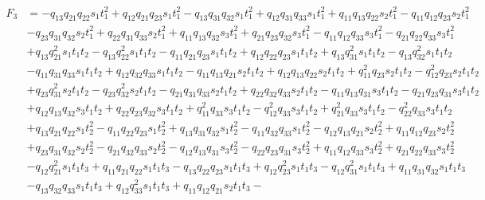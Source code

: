 \documentclass[10pt]{amsart}
\theoremstyle{definition}
\theoremstyle{corollary}
\theoremstyle{remark}
\theoremstyle{conclusion}
\begin{document}
{\small \begin{equation}
\begin{split}
F_3&=-q_{13} q_{21} q_{22} s_{1} t_{1}^2 + q_{12} q_{21} q_{23} s_{1} t_{1}^2 - q_{13} q_{31} q_{32} s_{1} t_{1}^2 + 
q_{12} q_{31} q_{33} s_{1} t_{1}^2 + q_{11} q_{13} q_{22} s_{2} t_{1}^2 - q_{11} q_{12} q_{23} s_{2} t_{1}^2\\
& - q_{23} q_{31} q_{32} s_{2} t_{1}^2 + q_{22} q_{31} q_{33} s_{2} t_{1}^2 + q_{11} q_{13} q_{32} s_{3} t_{1}^2 + 
q_{21} q_{23} q_{32} s_{3} t_{1}^2 - q_{11} q_{12} q_{33} s_{3} t_{1}^2 - q_{21} q_{22} q_{33} s_{3} t_{1}^2 \\
&+ 
q_{13} q_{21}^2 s_{1} t_{1} t_{2} - q_{13} q_{22}^2 s_{1} t_{1} t_{2} - q_{11} q_{21} q_{23} s_{1} t_{1} t_{2} + 
q_{12} q_{22} q_{23} s_{1} t_{1} t_{2} + q_{13} q_{31}^2 s_{1} t_{1} t_{2} - q_{13} q_{32}^2 s_{1} t_{1} t_{2} \\
&- 
q_{11} q_{31} q_{33} s_{1} t_{1} t_{2} + q_{12} q_{32} q_{33} s_{1} t_{1} t_{2} - q_{11} q_{13} q_{21} s_{2} t_{1} t_{2} + 
q_{12} q_{13} q_{22} s_{2} t_{1} t_{2} + q_{11}^2 q_{23} s_{2} t_{1} t_{2} - q_{12}^2 q_{23} s_{2} t_{1} t_{2} \\
&+ 
q_{23} q_{31}^2 s_{2} t_{1} t_{2} - q_{23} q_{32}^2 s_{2} t_{1} t_{2} - q_{21} q_{31} q_{33} s_{2} t_{1} t_{2} + 
q_{22} q_{32} q_{33} s_{2} t_{1} t_{2} - q_{11} q_{13} q_{31} s_{3} t_{1} t_{2} - q_{21} q_{23} q_{31} s_{3} t_{1} t_{2} \\
&+ 
q_{12} q_{13} q_{32} s_{3} t_{1} t_{2} + q_{22} q_{23} q_{32} s_{3} t_{1} t_{2} + q_{11}^2 q_{33} s_{3} t_{1} t_{2}- 
q_{12}^2 q_{33} s_{3} t_{1} t_{2} + q_{21}^2 q_{33} s_{3} t_{1} t_{2} - q_{22}^2 q_{33} s_{3} t_{1} t_{2} \\
&+ 
q_{13} q_{21} q_{22} s_{1} t_{2}^2 - q_{11} q_{22} q_{23} s_{1} t_{2}^2 + q_{13} q_{31} q_{32} s_{1} t_{2}^2 - 
q_{11} q_{32} q_{33} s_{1} t_{2}^2 - q_{12} q_{13} q_{21} s_{2} t_{2}^2 + q_{11} q_{12} q_{23} s_{2} t_{2}^2 \\
&+ 
q_{23} q_{31} q_{32} s_{2} t_{2}^2 - q_{21} q_{32} q_{33} s_{2} t_{2}^2 - q_{12} q_{13} q_{31} s_{3} t_{2}^2 - 
q_{22} q_{23} q_{31} s_{3} t_{2}^2 + q_{11} q_{12} q_{33} s_{3} t_{2}^2 + q_{21} q_{22} q_{33} s_{3} t_{2}^2 \\
&- 
q_{12} q_{21}^2 s_{1} t_{1} t_{3} + q_{11} q_{21} q_{22} s_{1} t_{1} t_{3} - q_{13} q_{22} q_{23} s_{1} t_{1} t_{3} + 
q_{12} q_{23}^2 s_{1} t_{1} t_{3} - q_{12} q_{31}^2 s_{1} t_{1} t_{3} + q_{11} q_{31} q_{32} s_{1} t_{1} t_{3} \\
&- 
q_{13} q_{32} q_{33} s_{1} t_{1} t_{3} + q_{12} q_{33}^2 s_{1} t_{1} t_{3} + q_{11} q_{12} q_{21} s_{2} t_{1} t_{3} - 

\end{split}
\end{equation}}
\end{document}
